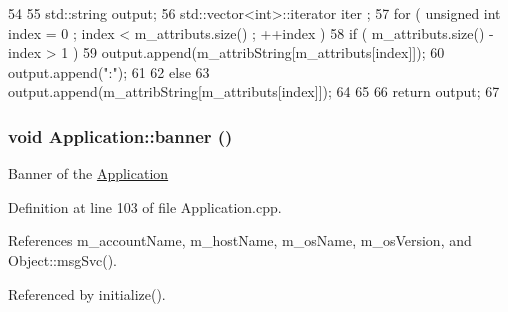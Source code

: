 \begin{DoxyCode}
54                             {
55   std::string output;
56   std::vector<int>::iterator iter ;
57   for ( unsigned int index = 0 ; index < m_attributs.size() ; ++index ) {
58     if ( m_attributs.size() - index > 1 ) {
59       output.append(m_attribString[m_attributs[index]]);
60       output.append(":");
61     }
62     else {
63       output.append(m_attribString[m_attributs[index]]);
64     }
65   }
66   return output;
67 }
\end{DoxyCode}
\hypertarget{classApplication_af168aa3579262d65adc0bd4531361a53}{
\subsubsection[{banner}]{\setlength{\rightskip}{0pt plus 5cm}void Application::banner ()}}
\label{classApplication_af168aa3579262d65adc0bd4531361a53}
Banner of the \hyperlink{classApplication}{Application} 

Definition at line 103 of file Application.cpp.

References m\_\-accountName, m\_\-hostName, m\_\-osName, m\_\-osVersion, and Object::msgSvc().

Referenced by initialize().


